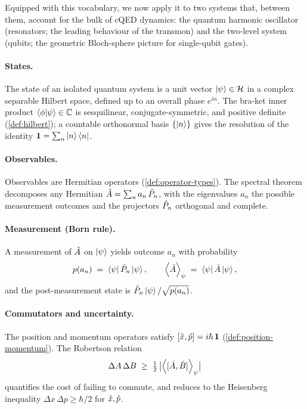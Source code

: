 Equipped with this vocabulary, we now apply it to two systems
that, between them, account for the bulk of cQED dynamics: the
quantum harmonic oscillator (resonators; the leading behaviour of
the transmon) and the two-level system (qubits; the geometric
Bloch-sphere picture for single-qubit gates).

\clearpage
\begin{chaptersummary}

\paragraph{States.}
The state of an isolated quantum system is a unit vector
$\ket{\psi}\in\mathcal{H}$ in a complex separable Hilbert space, defined
up to an overall phase $e^{i\alpha}$. The bra-ket inner product
$\braket{\phi}{\psi}\in\mathbb{C}$ is sesquilinear, conjugate-symmetric, and
positive definite (\cref{def:hilbert}); a countable orthonormal
basis $\{\ket{n}\}$ gives the resolution of the identity
$\mathbf{1}=\sum_n\ket{n}\bra{n}$.

\paragraph{Observables.}
Observables are Hermitian operators (\cref{def:operator-types}). The
spectral theorem decomposes any Hermitian
$\hat{A}=\sum_n a_n\,\hat{P}_n$, with the eigenvalues $a_n$ the
possible measurement outcomes and the projectors $\hat{P}_n$
orthogonal and complete.

\paragraph{Measurement (Born rule).}
A measurement of $\hat{A}$ on $\ket{\psi}$ yields outcome $a_n$ with
probability
\begin{equation}
p(a_n) \;=\; \bra{\psi}\hat{P}_n\ket{\psi},
\qquad
\expval{\hat{A}}_\psi \;=\; \bra{\psi}\hat{A}\ket{\psi},
\end{equation}
and the post-measurement state is
$\hat{P}_n\ket{\psi}/\sqrt{p(a_n)}$.

\paragraph{Commutators and uncertainty.}
The position and momentum operators satisfy
$[\hat{x},\hat{p}]=i\hbar\,\mathbf{1}$ (\cref{def:position-momentum}). The
Robertson relation
\begin{equation}
\Delta A\,\Delta B \;\geq\; \tfrac{1}{2}\,
\bigl|\expval{[\hat{A},\hat{B}]}_\psi\bigr|
\end{equation}
quantifies the cost of failing to commute, and reduces to the
Heisenberg inequality $\Delta x\,\Delta p\geq\hbar/2$ for $\hat{x},\hat{p}$.


\end{chaptersummary}
